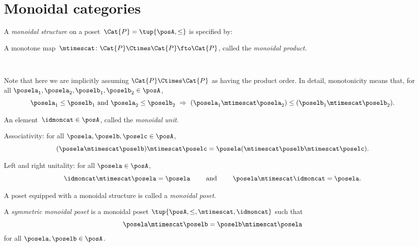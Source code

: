 

\section{Monoidal categories}
\label{sec:parallelism-mon-cat}


\begin{ctdefinition}
  \label{def:monoidal_poset}
  A \emph{monoidal structure} on a poset~$\Cat{P} = \tup{\posA, \leq}$ is specified by:
  
  \constit
  \begin{compactenum}
    \item A monotone map~$\mtimescat \colon \Cat{P} \Ctimes \Cat{P} \fto \Cat{P}$, called the \emph{monoidal product}. 
    
    \
    
    \noindent
    Note that here we are implicitly assuming $\Cat{P} \Ctimes \Cat{P}$ as having the product order. In detail, monotonicity means that, for all $\posela_1, \posela_2, \poselb_1, \poselb_2 \in \posA$, 
        $$
    \posela_1 \leq \poselb_1 \text{ and } \posela_2 \leq \poselb_2 \ \Rightarrow \ (\posela_1 \mtimescat  \posela_2) \leq  (\poselb_1 \mtimescat  \poselb_2).
    $$
    
    \item An element~$\idmoncat \in \posA$, called the \emph{monoidal unit}.
  \end{compactenum}
  
   \condit
    \begin{compactenum}
    \item Associativity: for all $\posela, \poselb, \poselc \in \posA$, 
    $$ (\posela \mtimescat \poselb) \mtimescat \poselc =  \posela ( \mtimescat \poselb \mtimescat \poselc).$$
    \item Left and right unitality: for all $\posela \in \posA$, 
    $$\idmoncat \mtimescat \posela = \posela \quad \quad \text{ and } \quad \quad \posela \mtimescat \idmoncat = \posela.$$
  \end{compactenum}
  
  \noindent A poset equipped with a monoidal structure is called a \emph{monoidal poset}.
\end{ctdefinition}

\begin{ctdefinition}
  \label{def:sym_monoidal_poset}
A \emph{symmetric monoidal poset} is a monoidal poset $\tup{\posA, \leq, \mtimescat, \idmoncat}$ such that
$$
\posela \mtimescat \poselb = \poselb \mtimescat \posela
$$
for all $\posela, \poselb \in \posA$. 
\end{ctdefinition}


